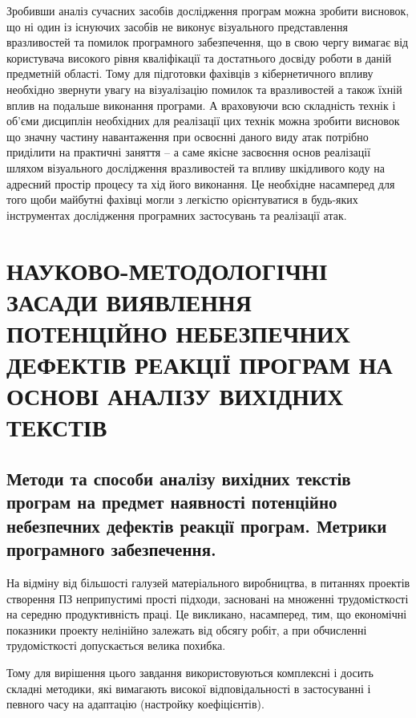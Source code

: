 \documentclass[oneside,final,14pt]{extreport}
\begin{document}
Зробивши аналіз сучасних засобів дослідження програм можна зробити висновок, що ні один із існуючих засобів не виконує візуального представлення вразливостей та помилок програмного забезпечення, що в свою чергу вимагає від користувача високого рівня кваліфікації та достатнього досвіду роботи в даній предметній області.
Тому для підготовки фахівців з кібернетичного впливу необхідно звернути увагу на візуалізацію помилок та вразливостей а також їхній вплив на подальше виконання програми.  А враховуючи всю складність технік і об’єми дисциплін необхідних для реалізації цих технік можна зробити висновок що значну частину навантаження при освоєнні даного виду атак потрібно приділити на практичні заняття – а саме якісне засвоєння основ реалізації шляхом візуального дослідження вразливостей та впливу шкідливого коду на адресний простір процесу та хід його виконання. Це необхідне насамперед для  того щоби майбутні фахівці могли з легкістю орієнтуватися в будь-яких інструментах дослідження програмних застосувань та реалізації атак.
\pagebreak

\section{НАУКОВО-МЕТОДОЛОГІЧНІ ЗАСАДИ ВИЯВЛЕННЯ ПОТЕНЦІЙНО НЕБЕЗПЕЧНИХ ДЕФЕКТІВ РЕАКЦІЇ ПРОГРАМ НА ОСНОВІ АНАЛІЗУ ВИХІДНИХ ТЕКСТІВ}
\label{2section::doc}\label{2section:id1}

\subsection{Методи та способи аналізу вихідних текстів програм на предмет наявності потенційно небезпечних дефектів реакції програм. Метрики програмного забезпечення.}
\label{2section:id2}
На відміну від більшості галузей матеріального виробництва, в питаннях проектів створення ПЗ неприпустимі прості підходи, засновані на множенні трудомісткості на середню продуктивність праці. Це викликано, насамперед, тим, що економічні показники проекту нелінійно залежать від обсягу робіт, а при обчисленні трудомісткості допускається велика похибка.

Тому для вирішення цього завдання використовуються комплексні і досить складні методики, які вимагають високої відповідальності в застосуванні і певного часу на адаптацію (настройку коефіцієнтів).
\end{document}
